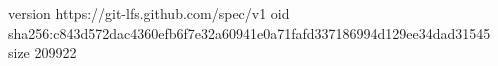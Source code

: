 version https://git-lfs.github.com/spec/v1
oid sha256:c843d572dac4360efb6f7e32a60941e0a71fafd337186994d129ee34dad31545
size 209922
